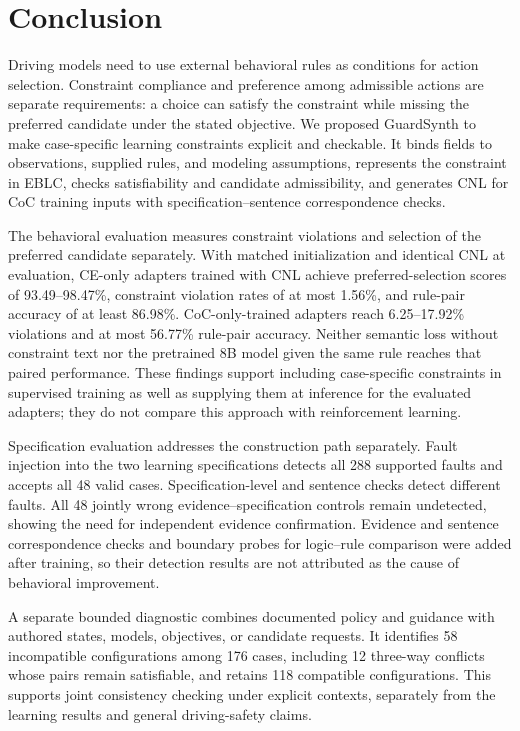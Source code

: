 \section{Conclusion}\label{sec:conclusion}

Driving models need to use external behavioral rules as conditions for action
selection. Constraint compliance and preference among admissible actions are
separate requirements: a choice can satisfy the constraint while missing the
preferred candidate under the stated objective. We proposed GuardSynth to make
case-specific learning constraints explicit and checkable. It binds fields to
observations, supplied rules, and modeling assumptions, represents the
constraint in EBLC, checks satisfiability and candidate admissibility, and
generates CNL for CoC training inputs with specification--sentence correspondence checks.

The behavioral evaluation measures constraint violations and selection of the
preferred candidate separately. With matched initialization and identical CNL
at evaluation, CE-only adapters trained with CNL achieve preferred-selection
scores of 93.49--98.47\%, constraint violation rates of at most 1.56\%, and
rule-pair accuracy of at least 86.98\%. CoC-only-trained adapters reach
6.25--17.92\% violations and at most 56.77\% rule-pair accuracy. Neither
semantic loss without constraint text nor the pretrained 8B model given the
same rule reaches that paired performance. These findings support including
case-specific constraints in supervised training as well as supplying them at
inference for the evaluated adapters; they do not compare this approach with
reinforcement learning.

Specification evaluation addresses the construction path separately. Fault
injection into the two learning specifications detects all 288 supported
faults and accepts all 48 valid cases. Specification-level and sentence
checks detect different faults. All 48 jointly wrong evidence--specification
controls remain undetected, showing the need for independent evidence
confirmation. Evidence and sentence correspondence checks and boundary probes for
logic--rule comparison were added after training, so their
detection results are not attributed as the cause of behavioral improvement.

A separate bounded diagnostic combines documented policy and guidance with
authored states, models, objectives, or candidate requests. It identifies
58 incompatible configurations among 176 cases, including 12 three-way
conflicts whose pairs remain satisfiable, and retains 118 compatible
configurations. This supports joint
consistency checking under explicit contexts, separately from the learning
results and general driving-safety claims.


